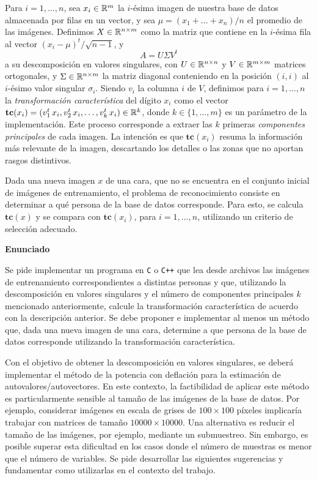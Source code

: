 Para $i = 1,\ldots, n$, sea $x_i \in \mathbb{R}^{m}$ la $i$-\'esima imagen de nuestra base de datos almacenada por filas en
un vector, y sea $\mu = (x_1 + \ldots + x_n)/n$ el promedio de las im\'agenes. Definimos $X\in\mathbb{R}^{n\times m}$ como la
matriz que contiene en la $i$-\'esima fila al vector $(x_i - \mu)^{t}/\sqrt{n-1}$, y $$A=U \Sigma V^t$$ a su descomposici\'on en valores singulares, con $U\in\mathbb{R}^{n\times n}$ y $V\in\mathbb{R}^{m\times m}$ matrices ortogonales, y $\Sigma\in\mathbb{R}^{n\times m}$ la matriz diagonal conteniendo en la posici\'on $(i,i)$ al $i$-\'esimo valor singular $\sigma_i$.
Siendo $v_i$ la columna $i$ de $V$, definimos para $i = 1,\ldots,n$ la \textsl{transformaci\'on caracter\'istica} del d\'igito $x_{i}$ como el vector $\mathbf{tc}(x_i) = (v_1^t\, x_i, v_2^t\, x_i,\ldots,v_k^t\, x_i) \in\mathbb{R}^k$, donde $k \in\{1,\ldots,m\}$ es un par\'ametro de la implementaci\'on. Este proceso corresponde a extraer las $k$ primeras \textit{componentes principales} de cada imagen. La intenci\'on es que $\mathbf{tc}(x_i)$ resuma la informaci\'on m\'as relevante de la imagen, descartando los detalles o las zonas que no aportan rasgos distintivos.

Dada una nueva imagen $x$ de una cara, que no se encuentra en el conjunto inicial de im\'agenes de entrenamiento, el
problema de reconocimiento consiste en determinar a qu\'e persona de la base de datos corresponde. Para esto, se calcula
$\mathbf{tc}(x)$ y se compara con $\mathbf{tc}(x_i)$, para $i = 1,\ldots, n$, utilizando un criterio de selecci\'on
adecuado.


{\bf\noindent Enunciado}

Se pide implementar un programa en \verb+C+ o \verb-C++- que lea desde archivos las im\'agenes de entrenamiento correspondientes a distintas
personas y que, utilizando la descomposici\'on en valores singulares y el n\'umero de componentes principales $k$
mencionado anteriormente, calcule la transformaci\'on caracter\'istica de acuerdo con la descripci\'on anterior. Se debe
proponer e implementar al menos un m\'etodo que, dada una nueva imagen de una cara, determine a que persona de la base
de datos corresponde utilizando la transformaci\'on caracter\'istica.

Con el objetivo de obtener la descomposici\'on en valores singulares, se deber\'a implementar el m\'etodo de la potencia
con deflaci\'on para la estimaci\'on de autovalores/autovectores. En este contexto, la factibilidad de aplicar este
m\'etodo es particularmente sensible al tama\~no de las im\'agenes de la base de datos. Por ejemplo, considerar im\'agenes
en escala de grises de $100 \times 100$ p\'ixeles implicar\'ia trabajar con matrices de tama\~no $10000 \times
10000$. Una alternativa es reducir el tama\~no de las im\'agenes, por ejemplo, mediante un submuestreo. 
Sin embargo, es posible superar esta dificultad en los casos donde el n\'umero de muestras es menor que el
n\'umero de variables. Se pide desarrollar las siguientes sugerencias y fundamentar como utilizarlas en el contexto del
trabajo.

